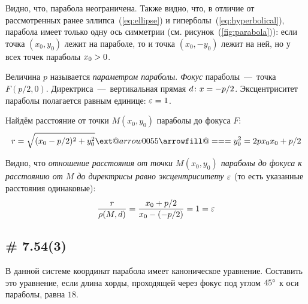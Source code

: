 \documentclass[a4paper,12pt]{article}
\makeatletter
\newcommand*{\Relbarfill@}{\arrowfill@\Relbar\Relbar\Relbar}
\newcommand*{\xeq}[2][]{\ext@arrow 0055\Relbarfill@{#1}{#2}}
\makeatother
\begin{document}
  Видно, что, парабола неограничена.
  Также видно, что, в отличие от рассмотренных ранее эллипса~(\ref{eq:ellipse}) и гиперболы~(\ref{eq:hyperbolical}), парабола имеет только одну ось симметрии (см. рисунок~(\ref{fig:parabola})): если точка $(x_0, y_0)$ лежит на параболе, то и точка $(x_0, -y_0)$ лежит на ней, но у всех точек параболы $x_0 \hm> 0$.
  
  Величина $p$ называется \emph{параметром параболы}.
  \emph{Фокус} параболы~---~точка $F(p/2, 0)$.
  Директриса~---~вертикальная прямая
  $
    d\colon x \hm= -p/2
  $.
  Эксцентриситет параболы полагается равным единице:
  $
    \varepsilon = 1
  $.
  
  Найдём расстояние от точки $M(x_0, y_0)$ параболы до фокуса $F$:
  \[
    r = \sqrt{(x_0 - p/2)^2 + y_0^2} \xeq{y_0^2 = 2px_0} x_0 + p/2
  \]
  
  Видно, что \emph{отношение расстояния от точки $M(x_0, y_0)$ параболы до фокуса к расстоянию от $M$ до директрисы равно эксцентриситету $\varepsilon$} (то есть указанные расстояния одинаковые):
  \[
    \frac{r}{\rho(M, d)} = \frac{x_0 + p/2}{x_0 - (-p/2)} = 1 = \varepsilon
  \]
  
  
  \subsection{\# 7.54(3)}
  
  В данной системе координат парабола имеет каноническое уравнение.
  Составить это уравнение, если длина хорды, проходящей через фокус под углом $45\degree$ к оси параболы, равна $18$.
  
\end{document}
